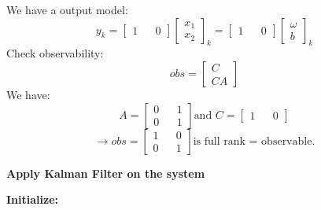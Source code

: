 \documentclass[12pt,a4paper]{article}
\begin{document}
	We have a output model:
	\begin{equation}
		\boxed{
			y_k = 
			\begin{bmatrix}
				1 &   & 0 
			\end{bmatrix}
			\begin{bmatrix}
				x_1 \\
				x_2 
			\end{bmatrix}_k = 
			\begin{bmatrix}
				1 &   & 0 
			\end{bmatrix}
			\begin{bmatrix}
				\omega \\
				b      
			\end{bmatrix}_k
		}
		\label{eq15}
	\end{equation}
	Check observability:
	\[obs = 
	\begin{bmatrix}
		C  \\
		CA 
	\end{bmatrix}\]
	We have:
	\[A = 
	\begin{bmatrix}
		0 &   & 1 \\
		0 &   & 1 
	\end{bmatrix} \text{and } C = 
	\begin{bmatrix}
		1 &   & 0 
	\end{bmatrix}\]
	\[\rightarrow obs = 
	\begin{bmatrix}
		1 &   & 0 \\
		0 &   & 1 
	\end{bmatrix} \text{is full rank = observable.}\]
	\begin{center}
		\textbf{Apply Kalman Filter on the system}
	\end{center}
	\textbf{Initialize:}
\end{document}

